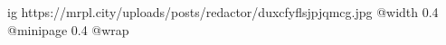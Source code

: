  
 
 
 
 

\ifcmt
  ig https://mrpl.city/uploads/posts/redactor/duxcfyflsjpjqmcg.jpg
  @width 0.4
  @minipage 0.4
  @wrap \parpic[r]
\fi
